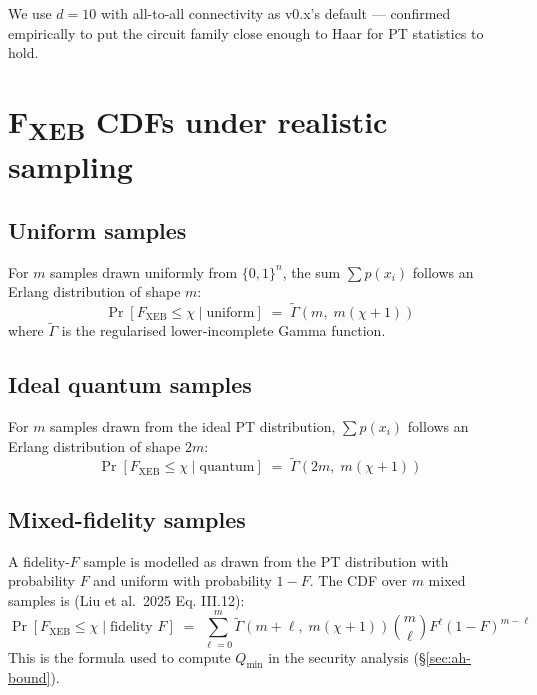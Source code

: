 \documentclass[11pt,a4paper]{article}
\theoremstyle{plain}
\theoremstyle{definition}
\theoremstyle{remark}
\renewcommand{\Pr}{\operatorname{Pr}}
\begin{document}
We use $d=10$ with all-to-all connectivity as v0.x's default --- confirmed empirically to put the circuit family close enough to Haar for PT statistics to hold.

\section{F\textsubscript{XEB} CDFs under realistic sampling}

\subsection{Uniform samples}

For $m$ samples drawn uniformly from $\{0,1\}^n$, the sum $\sum p(x_i)$ follows an Erlang distribution of shape $m$:
\begin{equation}
\Pr[F_{\mathrm{XEB}} \leq \chi \mid \text{uniform}] \;=\; \tilde{\Gamma}\!\left(m,\; m(\chi+1)\right)
\end{equation}
where $\tilde{\Gamma}$ is the regularised lower-incomplete Gamma function.

\subsection{Ideal quantum samples}

For $m$ samples drawn from the ideal PT distribution, $\sum p(x_i)$ follows an Erlang distribution of shape $2m$:
\begin{equation}
\Pr[F_{\mathrm{XEB}} \leq \chi \mid \text{quantum}] \;=\; \tilde{\Gamma}\!\left(2m,\; m(\chi+1)\right)
\end{equation}

\subsection{Mixed-fidelity samples}

A fidelity-$F$ sample is modelled as drawn from the PT distribution with probability $F$ and uniform with probability $1-F$. The CDF over $m$ mixed samples is (Liu et al.\ 2025 Eq. III.12):
\begin{equation}
\Pr[F_{\mathrm{XEB}} \leq \chi \mid \text{fidelity } F] \;=\; \sum_{\ell=0}^{m} \tilde{\Gamma}\!\left(m+\ell,\; m(\chi+1)\right) \binom{m}{\ell} F^{\ell} (1-F)^{m-\ell}
\label{eq:mixed-cdf}
\end{equation}
This is the formula used to compute $Q_{\min}$ in the security analysis (§\ref{sec:ah-bound}).
\end{document}
